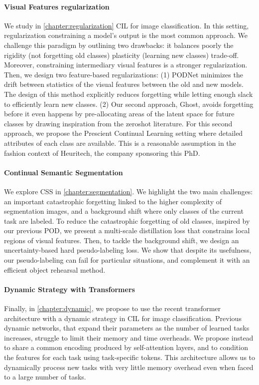 \paragraph{Visual Features regularization} We study in \autoref{chapter:regularization} \ac{CIL} for
image classification. In this setting, regularization constraining a model's output is the most
common approach. We challenge this paradigm by outlining two drawbacks: it balances poorly the
rigidity (not forgetting old classes) \vs plasticity (learning new classes) trade-off. Moreover,
constraining intermediary visual features is a stronger regularization. Then, we design two
feature-based regularizations: (1) PODNet minimizes the drift between statistics of the visual
features between the old and new models. The design of this method explicitly reduces forgetting
while letting enough slack to efficiently learn new classes. (2) Our second approach, Ghost, avoids
forgetting before it even happens by pre-allocating areas of the latent space for future classes by
drawing inspiration from the zeroshot literature. For this second approach, we propose the Prescient
Continual Learning setting where detailed attributes of each class are available. This is a
reasonable assumption in the fashion context of Heuritech, the company sponsoring this PhD.

\paragraph{Continual Semantic Segmentation} We explore \ac{CSS} in \autoref{chapter:segmentation}.
We highlight the two main challenges: an important catastrophic forgetting linked to the higher
complexity of segmentation images, and a background shift where only classes of the current task are
labeled. To reduce the catastrophic forgetting of old classes, inspired by our previous POD, we
present a multi-scale distillation loss that constrains local regions of visual features. Then, to
tackle the background shift, we design an uncertainty-based hard pseudo-labeling loss. We show that
despite its usefulness, our pseudo-labeling can fail for particular situations, and complement it
with an efficient object rehearsal method.

\paragraph{Dynamic Strategy with Transformers} Finally, in \autoref{chapter:dynamic}, we propose to
use the recent transformer architecture with a dynamic strategy in \acf{CIL} for image
classification. Previous dynamic networks, that expand their parameters as the number of learned
tasks increases, struggle to limit their memory and time overheads. We propose instead to share a
common encoding produced by self-attention layers, and to condition the features for each task using
task-specific tokens. This architecture allows us to dynamically process new tasks with very little
memory overhead even when faced to a large number of tasks.

